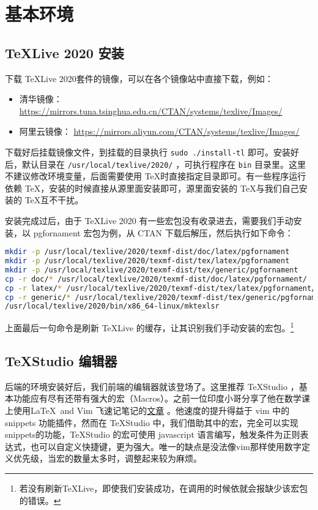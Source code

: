 \section{基本环境}

\subsection{\TeX Live 2020 安装}

下载 \TeX Live 2020套件的镜像，可以在各个镜像站中直接下载，例如：
\begin{itemize}
	\item 
	清华镜像：
	\url{https://mirrors.tuna.tsinghua.edu.cn/CTAN/systems/texlive/Images/}
	\item 
	阿里云镜像：
	\url{https://mirrors.aliyun.com/CTAN/systems/texlive/Images/}
\end{itemize}

下载好后挂载镜像文件，到挂载的目录执行 \lstinline!sudo ./install-tl! 即可。安装好后，默认目录在 \lstinline|/usr/local/texlive/2020/| ，可执行程序在 \lstinline|bin| 目录里。这里不建议修改环境变量，后面需要使用 \TeX 时直接指定目录即可。有一些程序运行依赖 \TeX ，安装的时候直接从源里面安装即可，源里面安装的 \TeX 与我们自己安装的 \TeX 互不干扰。 

安装完成过后，由于 \TeX Live 2020 有一些宏包没有收录进去，需要我们手动安装，以 pgfornament 宏包为例，从 CTAN 下载后解压，然后执行如下命令：
\begin{lstlisting}[language=bash]
mkdir -p /usr/local/texlive/2020/texmf-dist/doc/latex/pgfornament
mkdir -p /usr/local/texlive/2020/texmf-dist/tex/latex/pgfornament
mkdir -p /usr/local/texlive/2020/texmf-dist/tex/generic/pgfornament
cp -r doc/* /usr/local/texlive/2020/texmf-dist/doc/latex/pgfornament/
cp -r latex/* /usr/local/texlive/2020/texmf-dist/tex/latex/pgfornament/
cp -r generic/* /usr/local/texlive/2020/texmf-dist/tex/generic/pgfornament/
/usr/local/texlive/2020/bin/x86_64-linux/mktexlsr
\end{lstlisting}
上面最后一句命令是刷新  \TeX Live 的缓存，让其识别我们手动安装的宏包。\footnote{若没有刷新\TeX Live，即使我们安装成功，在调用的时候依就会报缺少该宏包的错误。}

\subsection{TeXStudio 编辑器}

后端的环境安装好后，我们前端的编辑器就该登场了。这里推荐 TeXStudio ，基本功能应有尽有还带有强大的宏（Macros）。之前一位印度小哥分享了他在数学课上使用\LaTeX  \ and Vim 飞速记笔记的\hyperref{https://castel.dev/post/lecture-notes-1/}{category}{name}{文章} 。他速度的提升得益于 vim 中的 snippets 功能插件，然而在 TeXStudio 中，我们借助其中的宏，完全可以实现snippets的功能，TeXStudio 的宏可使用 javascript 语言编写，触发条件为正则表达式，也可以自定义快捷键，更为强大。唯一的缺点是没法像vim那样使用数字定义优先级，当宏的数量太多时，调整起来较为麻烦。


